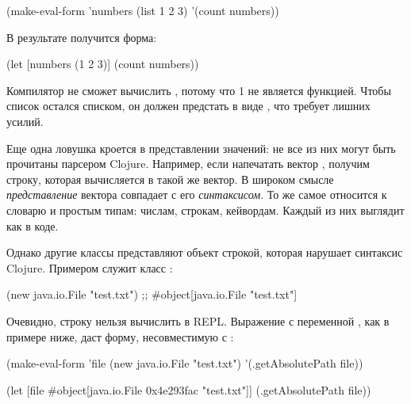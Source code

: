 \begin{english}
  \begin{clojure}
(make-eval-form {'numbers (list 1 2 3)}
                '(count numbers))
  \end{clojure}
\end{english}

\pagebreaklarge

В результате получится форма:

\begin{english}
  \begin{clojure}
(let [numbers (1 2 3)]
  (count numbers))
  \end{clojure}
\end{english}

Компилятор не сможет вычислить , потому что 1 не является функцией. Чтобы список остался списком, он должен предстать в виде , что требует лишних усилий.

Еще одна ловушка кроется в представлении значений: не все из них могут быть прочитаны парсером Clojure. Например, если напечатать вектор \code{[1 2 3]}, получим строку, которая вычисляется в такой же вектор. В широком смысле \emph{представление} вектора совпадает с его \emph{синтаксисом}. То же самое относится к словарю и простым типам: числам, строкам, кейвордам. Каждый из них выглядит как в коде.

Однако другие классы представляют объект строкой, которая нарушает синтаксис Clojure. Примером служит класс :

\begin{english}
  \begin{clojure}
(new java.io.File "test.txt")
;; #object[java.io.File "test.txt"]
  \end{clojure}
\end{english}

Очевидно, строку  нельзя вычислить в REPL. Выражение с переменной , как в примере ниже, даст форму, несовместимую с :

\begin{english}
  \begin{clojure}
(make-eval-form
 {'file (new java.io.File "test.txt")}
 '(.getAbsolutePath file))

(let [file #object[java.io.File 0x4e293fac "test.txt"]]
  (.getAbsolutePath file))
  \end{clojure}
\end{english}

